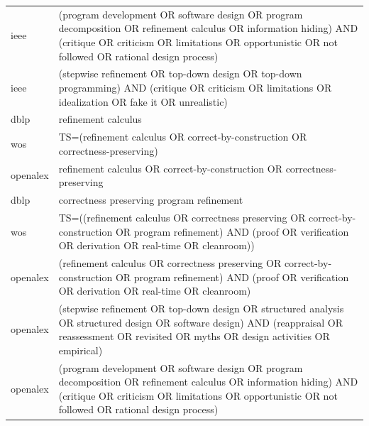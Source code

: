 \documentclass{article}
\begin{document}
\begin{longtable}{lp{10cm}}
ieee & (\textquotedbl{}program development\textquotedbl{} OR \textquotedbl{}software design\textquotedbl{} OR \textquotedbl{}program decomposition\textquotedbl{} OR \textquotedbl{}refinement calculus\textquotedbl{} OR \textquotedbl{}information hiding\textquotedbl{}) AND (critique OR criticism OR limitations OR opportunistic OR \textquotedbl{}not followed\textquotedbl{} OR \textquotedbl{}rational design process\textquotedbl{}) \\
ieee & (\textquotedbl{}stepwise refinement\textquotedbl{} OR \textquotedbl{}top-down design\textquotedbl{} OR \textquotedbl{}top-down programming\textquotedbl{}) AND (critique OR criticism OR limitations OR idealization OR \textquotedbl{}fake it\textquotedbl{} OR unrealistic) \\
dblp & refinement calculus \\
wos & TS=(\textquotedbl{}refinement calculus\textquotedbl{} OR \textquotedbl{}correct-by-construction\textquotedbl{} OR \textquotedbl{}correctness-preserving\textquotedbl{}) \\
openalex & \textquotedbl{}refinement calculus\textquotedbl{} OR \textquotedbl{}correct-by-construction\textquotedbl{} OR \textquotedbl{}correctness-preserving\textquotedbl{} \\
dblp & correctness preserving program refinement \\
wos & TS=((\textquotedbl{}refinement calculus\textquotedbl{} OR \textquotedbl{}correctness preserving\textquotedbl{} OR \textquotedbl{}correct-by-construction\textquotedbl{} OR \textquotedbl{}program refinement\textquotedbl{}) AND (proof OR verification OR derivation OR \textquotedbl{}real-time\textquotedbl{} OR cleanroom)) \\
openalex & (\textquotedbl{}refinement calculus\textquotedbl{} OR \textquotedbl{}correctness preserving\textquotedbl{} OR \textquotedbl{}correct-by-construction\textquotedbl{} OR \textquotedbl{}program refinement\textquotedbl{}) AND (proof OR verification OR derivation OR \textquotedbl{}real-time\textquotedbl{} OR cleanroom) \\
openalex & (\textquotedbl{}stepwise refinement\textquotedbl{} OR \textquotedbl{}top-down design\textquotedbl{} OR \textquotedbl{}structured analysis\textquotedbl{} OR \textquotedbl{}structured design\textquotedbl{} OR \textquotedbl{}software design\textquotedbl{}) AND (reappraisal OR reassessment OR revisited OR myths OR \textquotedbl{}design activities\textquotedbl{} OR empirical) \\
openalex & (\textquotedbl{}program development\textquotedbl{} OR \textquotedbl{}software design\textquotedbl{} OR \textquotedbl{}program decomposition\textquotedbl{} OR \textquotedbl{}refinement calculus\textquotedbl{} OR \textquotedbl{}information hiding\textquotedbl{}) AND (critique OR criticism OR limitations OR opportunistic OR \textquotedbl{}not followed\textquotedbl{} OR \textquotedbl{}rational design process\textquotedbl{}) \\

\end{longtable}
\end{document}
